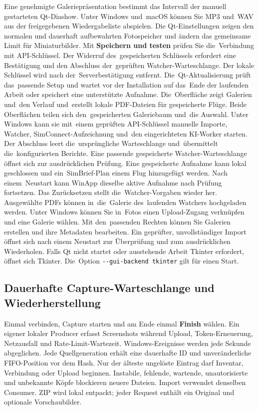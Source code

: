 \documentclass[11pt,a4paper]{article}
\newcommand{\ui}[1]{\textbf{#1}}
\newcommand{\codeword}[1]{\nolinkurl{#1}}
\begin{document}
Eine genehmigte Galeriepräsentation bestimmt das Intervall der manuell
gestarteten Qt-Diashow. Unter Windows und~macOS können Sie MP3 und~WAV aus
der freigegebenen Wiedergabeliste abspielen.
Die Qt-Einstellungen zeigen den normalen und dauerhaft aufbewahrten
Fotospeicher und ändern das gemeinsame Limit für Miniaturbilder.
Mit \ui{Speichern und testen} prüfen Sie die~Verbindung mit API-Schlüssel.
Der Widerruf des~gespeicherten Schlüssels erfordert eine Bestätigung und
den Abschluss der~geprüften Watcher-Warteschlange. Der lokale Schlüssel
wird nach der~Serverbestätigung entfernt.
Die~Qt-Aktualisierung prüft das~passende Setup und wartet vor der Installation
auf das~Ende der laufenden Arbeit oder speichert eine unterstützte Aufnahme.
Die~Oberfläche zeigt Galerien und~den Verlauf und~erstellt lokale PDF-Dateien
für gespeicherte Flüge. Beide Oberflächen teilen sich den~gespeicherten
Galeriebaum und~die Auswahl. Unter Windows kann sie mit~einem
geprüften API-Schlüssel manuelle Importe, Watcher, SimConnect-Aufzeichnung
und~den eingerichteten KI-Worker starten. Der Abschluss leert die~ursprüngliche
Warteschlange und~übermittelt die~konfigurierten Berichte. Eine passende
gespeicherte Watcher-Warteschlange öffnet sich zur ausdrücklichen Prüfung.
Eine gespeicherte Aufnahme kann lokal geschlossen und ein~SimBrief-Plan
einem Flug hinzugefügt werden.
Nach einem~Neustart kann WinApp dieselbe aktive Aufnahme nach Prüfung fortsetzen.
Das Zurücksetzen stellt die~Watcher-Vorgaben wieder her. Ausgewählte PDFs
können in~die~Galerie des~laufenden Watchers hochgeladen werden.
Unter Windows können Sie in~Fotos einen Upload-Zugang verknüpfen und eine
Galerie wählen. Mit den~passenden Rechten können Sie Galerien erstellen
und ihre Metadaten bearbeiten.
Ein geprüfter, unvollständiger Import öffnet sich nach einem Neustart zur
Überprüfung und zum ausdrücklichen Wiederholen.
Falls Qt nicht startet oder ausstehende Arbeit Tkinter erfordert, öffnet sich Tkinter. Die~Option
\codeword{--gui-backend tkinter} gilt für einen Start.

\subsection{Dauerhafte Capture-Warteschlange und Wiederherstellung}

Einmal verbinden, Capture starten und am Ende einmal \ui{Finish} wählen.
Ein eigener lokaler Producer erfasst Screenshots während Upload,
Token-Erneuerung, Netzausfall und Rate-Limit-Wartezeit. Windows-Ereignisse
werden jede Sekunde abgeglichen. Jede Quellgeneration erhält eine dauerhafte
ID und unveränderliche FIFO-Position vor dem Hash. Nur der älteste ungelöste
Eintrag darf Inventar, Verbindung oder Upload beginnen. Instabile, fehlende,
wartende, unautorisierte und unbekannte Köpfe blockieren neuere Dateien.
Import verwendet denselben Consumer. ZIP wird lokal entpackt; jeder Request
enthält ein Original und optionale Vorschaubilder.
\end{document}
